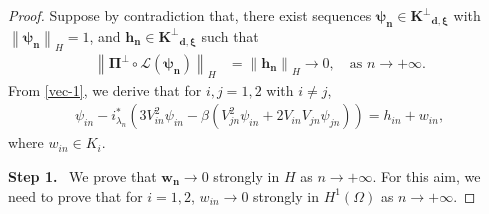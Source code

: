 \documentclass[a4paper,reqno,11pt,oneside]{amsart}
\numberwithin{equation}{section}
\begin{document}
\begin{proof} Suppose by contradiction that, there exist sequences $\bm{\psi_{{n}}} \in \bm{K^{\perp}}_{\bm{d},\bm{\xi}}$ with $\left\|{\bm{\psi_{{n}}}}\right\|_{H}=1$, and $\bm{h_n}\in\bm{K^{\perp}}_{\bm{d},\bm{\xi}}$ such that   
    \begin{align*}
\left\|\bm\Pi^{\perp}\circ\bm{\mathcal{L}}(\bm{\psi_n})\right\|_{H}&=\left\|\bm{{h}_{n}}\right\|_{H} \rightarrow 0,\quad\text{as $n\rightarrow +\infty$}.
    \end{align*}
From \eqref{vec-1}, we derive that for $i,j=1,2$ with $i\neq j$,
\begin{align}\label{new-psi}
   \psi_{in}-i_{\lambda_n}^{*}\left(3V_{in}^2\psi_{in}-\beta\left(V_{jn}^2\psi_{in}+2V_{in}V_{jn}\psi_{jn}\right)\right)=h_{in}+w_{in},
\end{align}
where $w_{{in}} \in K_i$.


\medskip
\textbf{Step 1.}~ We prove that $\bm{w_{{n}}} \rightarrow 0$ strongly in $H$ as $n \rightarrow+\infty$. For this aim, we need to prove that for $i=1,2$, $w_{in}\rightarrow 0$  strongly in $H^1(\Omega)$ as $n \rightarrow+\infty$. 


\end{proof}
\end{document}
